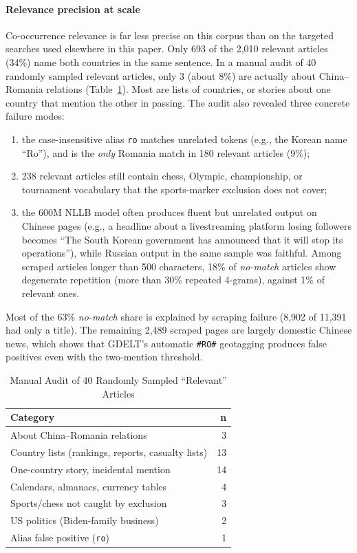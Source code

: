 \documentclass[conference]{IEEEtran}
\begin{document}
\paragraph{Relevance precision at scale}
Co-occurrence relevance is far less precise on this corpus than on the
targeted searches used elsewhere in this paper. Only 693 of the 2,010
relevant articles (34\%) name both countries in the same sentence. In a
manual audit of 40 randomly sampled relevant articles, only 3 (about 8\%)
are actually about China--Romania relations (Table~\ref{tab:bq-audit}). Most
are lists of countries, or stories about one country that mention the other
in passing. The audit also revealed three concrete failure modes:
\begin{enumerate}
  \item the case-insensitive alias \texttt{ro} matches unrelated tokens
        (e.g., the Korean name ``Ro''), and is the \emph{only} Romania match
        in 180 relevant articles (9\%);
  \item 238 relevant articles still contain chess, Olympic, championship,
        or tournament vocabulary that the sports-marker exclusion does not
        cover;
  \item the 600M NLLB model often produces fluent but unrelated output on
        Chinese pages (e.g., a headline about a livestreaming platform losing
        followers becomes ``The South Korean government has announced that it
        will stop its operations''), while Russian output in the same sample
        was faithful. Among scraped articles longer than 500 characters, 18\%
        of \emph{no-match} articles show degenerate repetition (more than 30\%
        repeated 4-grams), against 1\% of relevant ones.
\end{enumerate}
Most of the 63\% \emph{no-match} share is explained by scraping failure
(8,902 of 11,391 had only a title). The remaining 2,489 scraped pages are
largely domestic Chinese news, which shows that GDELT's automatic
\texttt{\#RO\#} geotagging produces false positives even with the
two-mention threshold.

\begin{table}[htbp]
\caption{Manual Audit of 40 Randomly Sampled ``Relevant'' Articles}
\label{tab:bq-audit}
\centering
\small
\begin{tabular}{lr}
\toprule
\textbf{Category} & \textbf{n} \\
\midrule
About China--Romania relations & 3 \\
Country lists (rankings, reports, casualty lists) & 13 \\
One-country story, incidental mention & 14 \\
Calendars, almanacs, currency tables & 4 \\
Sports/chess not caught by exclusion & 3 \\
US politics (Biden-family business) & 2 \\
Alias false positive (\texttt{ro}) & 1 \\
\bottomrule
\end{tabular}
\end{table}
\end{document}

